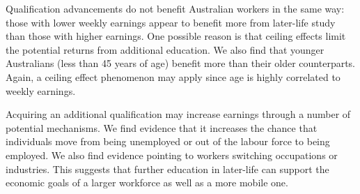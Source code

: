 \documentclass[12pt, a4paper]{article}
\begin{document}


Qualification advancements do not benefit Australian workers in the same way:
those with lower weekly earnings appear to benefit more from later-life study
than those with higher earnings. One possible reason is that ceiling effects
limit the potential returns from additional education. We also find that
younger Australians (less than 45 years of age) benefit more than their older
counterparts. Again, a ceiling effect phenomenon may apply since age is highly
correlated to weekly earnings.


Acquiring an additional qualification may increase earnings through a number of potential mechanisms. We find evidence that it increases the chance that individuals move from being unemployed or out of the labour force to being employed. We also find evidence pointing to workers switching occupations or industries. This suggests that further education in later-life can support the economic goals of a larger workforce as well as a more mobile one.


\end{document}
